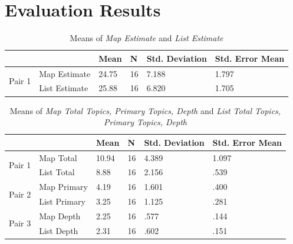 \section{Evaluation Results} \label{sec:evalresults}

\begin{table}[hbtp!]
\centering
\caption{Means of \textit{Map Estimate} and \textit{List Estimate}} \vspace{0.3cm}
\label{res:estimatepre}
\begin{tabular}{|l|l|llll|}
\hline
\multicolumn{2}{|c|}{}  & Mean  & N  & Std. Deviation & Std. Error Mean \\ \hline\hline
\multirow{2}{*}{Pair 1} & Map Estimate  & 24.75 & 16 & 7.188          & 1.797           \\ \cline{2-6}
                        & List Estimate & 25.88 & 16 & 6.820          & 1.705
                        \\ \hline          
\end{tabular}
\end{table}

\begin{table}[hbtp!]
\centering
\caption{Means of \textit{Map Total Topics, Primary Topics, Depth} and \textit{List Total Topics, Primary Topics, Depth}} \vspace{0.3cm}
\label{res:indexpre}
\begin{tabular}{|l|l|llll|}
\hline
\multicolumn{2}{|c|}{}  & Mean  & N  & Std. Deviation & Std. Error Mean \\ \hline\hline
\multirow{2}{*}{Pair 1} & Map Total  & 10.94 & 16 & 4.389 & 1.097 \\ \cline{2-6}
                        & List Total & 8.88  & 16 & 2.156 & .539  \\ \hline
\multirow{2}{*}{Pair 2} & Map Primary  & 4.19  & 16 & 1.601 & .400  \\ \cline{2-6}
                        & List Primary & 3.25  & 16 & 1.125 & .281  \\ \hline
\multirow{2}{*}{Pair 3} & Map Depth  & 2.25  & 16 & .577  & .144  \\ \cline{2-6}
                        & List Depth & 2.31  & 16 & .602  & .151  \\
\hline          
\end{tabular}
\end{table}

